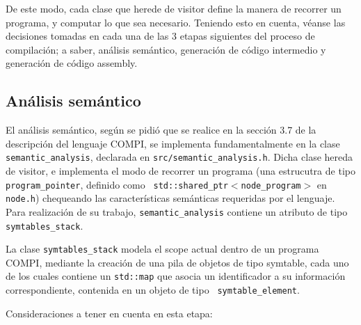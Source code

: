 \documentclass[12pt, a4paper, titlepage]{article}
\begin{document}
	De este modo, cada clase que herede de visitor define la manera de recorrer un
	programa, y computar lo que sea necesario. Teniendo esto en cuenta, véanse las
	decisiones tomadas en cada una de las 3 etapas siguientes del proceso de
	compilación; a saber, análisis semántico, generación de código intermedio y
	generación de código assembly.

  \subsection{Análisis semántico}

	El análisis semántico, según se pidió que se realice en la sección 3.7 de la
	descripción del lenguaje COMPI, se implementa fundamentalmente en la clase
	{\tt semantic\_analysis}, declarada en {\tt src/semantic\_analysis.h}. Dicha
	clase hereda de visitor, e implementa el modo de recorrer un programa (una
	estrucutra de tipo {\tt program\_pointer}, definido como {\tt
	std::shared\_ptr$<$node\_program$>$} en {\tt node.h}) chequeando las
	características semánticas requeridas por el lenguaje. Para realización de su
	trabajo, {\tt semantic\_analysis} contiene un atributo de tipo {\tt
	symtables\_stack}.

	La clase {\tt symtables\_stack} modela el scope actual dentro de un programa
	COMPI, mediante la creación de una pila de objetos de tipo symtable, cada uno
	de los cuales contiene un {\tt std::map} que asocia un identificador a su
	información correspondiente, contenida en un objeto de tipo {\tt
	symtable\_element}.

	Consideraciones a tener en cuenta en esta etapa:
\end{document}
